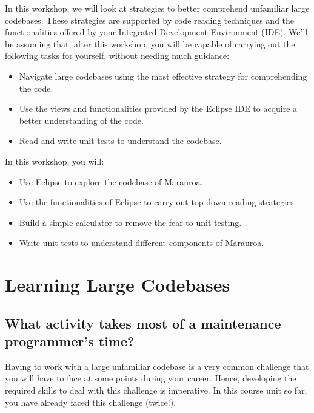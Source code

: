 \documentclass[
]{book}
\providecommand{\tightlist}{%
  \setlength{\itemsep}{0pt}\setlength{\parskip}{0pt}}
\begin{document}
In this workshop, we will look at strategies to better comprehend unfamiliar large codebases. These strategies are supported by code reading techniques and the functionalities offered by your Integrated Development Environment (IDE). We'll be assuming that, after this workshop, you will be capable of carrying out the following tasks for yourself, without needing much guidance:

\begin{itemize}
\tightlist
\item
  Navigate large codebases using the most effective strategy for comprehending the code.
\item
  Use the views and functionalities provided by the Eclipse IDE to acquire a better understanding of the code.\\
\item
  Read and write unit tests to understand the codebase.
\end{itemize}

In this workshop, you will:

\begin{itemize}
\tightlist
\item
  Use Eclipse to explore the codebase of Marauroa.
\item
  Use the functionalities of Eclipse to carry out top-down reading strategies.
\item
  Build a simple calculator to remove the fear to unit testing.
\item
  Write unit tests to understand different components of Marauroa.
\end{itemize}

\hypertarget{learning-large-codebases}{%
\section{Learning Large Codebases}\label{learning-large-codebases}}

\hypertarget{timesink}{%
\subsection{What activity takes most of a maintenance programmer's time?}\label{timesink}}

Having to work with a large unfamiliar codebase is a very common challenge that you will have to face at some points during your career. Hence, developing the required skills to deal with this challenge is imperative. In this course unit so far, you have already faced this challenge (twice!).
\end{document}
